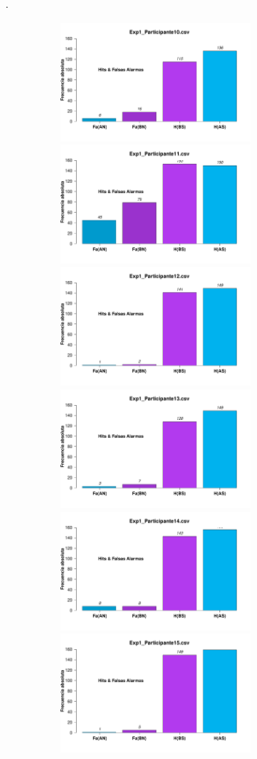 \documentclass[a4paper ]{article}
\begin{document}
\vfill .
\begin{figure}[th]
\begin{center}
\includegraphics[width=8cm, height=4cm]{Figures/MirrorRate_Exp1_P10} \includegraphics[width=8cm, height=4cm]{Figures/MirrorRate_Exp1_P11} \includegraphics[width=8cm, height=4cm]{Figures/MirrorRate_Exp1_P12}
\includegraphics[width=8cm, height=4cm]{Figures/MirrorRate_Exp1_P13} \includegraphics[width=8cm, height=4cm]{Figures/MirrorRate_Exp1_P14} \includegraphics[width=8cm, height=4cm]{Figures/MirrorRate_Exp1_P15}

\end{center}
\end{figure}
\end{document}
